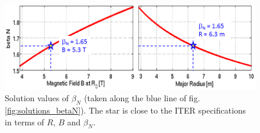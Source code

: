 \begin{figure} 
	\begin{center}
		\includegraphics[width=1.\textwidth]{figures/Fig_betaN_solutions_2graphsRB.png}
		\caption{Solution values of $\beta_N$ (taken along the blue line of fig.\ref{fig:solutions_betaN}). The star is close to the ITER specifications in terms of $R$, $B$ and $\beta_N$.}
		\label{fig:}
	\end{center}
\end{figure}

